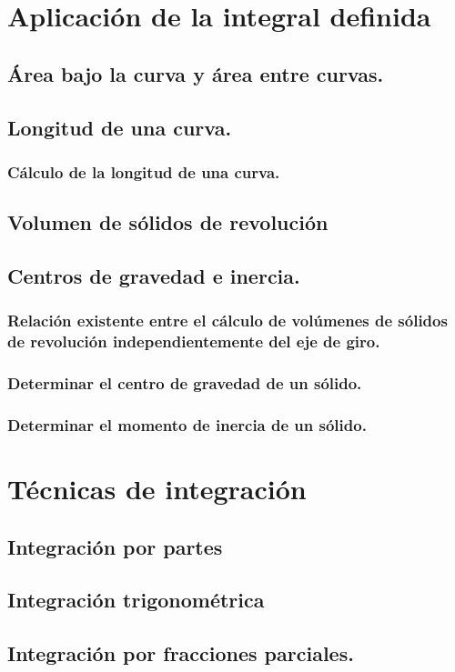 \section{Aplicación de la integral definida} %
\subsection{Área bajo la curva y área entre curvas.}
\subsection{Longitud de una curva.}
\subsubsection{Cálculo de la longitud de una curva.}
\subsection{Volumen de sólidos de revolución}
\subsection{Centros de gravedad e inercia.}
\subsubsection{Relación existente entre el cálculo de volúmenes de sólidos de revolución independientemente del eje de giro.}
\subsubsection{Determinar el centro de gravedad de un sólido.}
\subsubsection{Determinar el momento de inercia de un sólido.}



\section{Técnicas de integración} %

\subsection{Integración por partes}
\subsection{Integración trigonométrica}
\subsection{Integración por fracciones parciales.}
